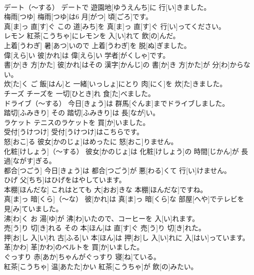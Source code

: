 \documentclass[8pt]{extreport}
\begin{document}
\begin{CJK}{UTF8}{min}
\\	デート（～する）	デートで 遊園地[ゆうえんち]に 行[い]きました。		
\\	梅雨[つゆ]	梅雨[つゆ]は6 月[がつ] 頃[ごろ]です。		
\\	真[ま]っ 直[す]ぐ	この 道[みち]を 真[ま]っ 直[す]ぐ 行[い]ってください。		
\\	レモン	紅茶[こうちゃ]にレモンを 入[い]れて 飲[の]んだ。		
\\	上着[うわぎ]	暑[あつ]いので 上着[うわぎ]を 脱[ぬ]ぎました。		
\\	偉[えら]い	彼[かれ]は 偉[えら]い 学者[がくしゃ]です。		
\\	書[か]き 方[かた]	彼[かれ]はその 漢字[かんじ]の 書[か]き 方[かた]が 分[わ]からない。		
\\	炊[た]く	ご 飯[はん]と 一緒[いっしょ]にとり 肉[にく]を 炊[た]きました。		
\\	チーズ	チーズを 一切[ひとき]れ 食[た]べました。		
\\	ドライブ（～する）	今日[きょう]は 群馬[ぐんま]までドライブしました。		
\\	踏切[ふみきり]	その 踏切[ふみきり]は 長[なが]い。		
\\	ラケット	テニスのラケットを 買[か]いました。		
\\	受付[うけつけ]	受付[うけつけ]はこちらです。		
\\	怒[おこ]る	彼女[かのじょ]はめったに 怒[おこ]りません。		
\\	化粧[けしょう]（～する）	彼女[かのじょ]は 化粧[けしょう]の 時間[じかん]が 長過[ながす]ぎる。		
\\	都合[つごう]	今日[きょう]は 都合[つごう]が 悪[わる]くて 行[い]けません。		
\\	ひげ	父[ちち]はひげをはやしています。		
\\	本棚[ほんだな]	これはとても 大[おお]きな 本棚[ほんだな]ですね。		
\\	真[ま]っ 暗[くら]（～な）	彼[かれ]は 真[ま]っ 暗[くら]な 部屋[へや]でテレビを 見[み]ていました。		
\\	沸[わ]く	お 湯[ゆ]が 沸[わ]いたので、コーヒーを 入[い]れます。		
\\	売[う]り 切[き]れる	その 本[ほん]は 直[す]ぐ 売[う]り 切[き]れた。		
\\	押[お]し 入[い]れ	古[ふる]い 本[ほん]は 押[お]し 入[い]れに 入[はい]っています。		
\\	革[かわ]	革[かわ]のベルトを 買[か]いました。		
\\	ぐっすり	赤[あか]ちゃんがぐっすり 寝[ね]ている。		
\\	紅茶[こうちゃ]	温[あたた]かい 紅茶[こうちゃ]が 飲[の]みたい。		

\end{CJK}
\end{document}
